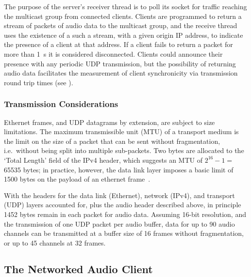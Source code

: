 The purpose of the server's receiver thread is to poll its socket for traffic
reaching the multicast group from connected clients.
Clients are programmed to return a stream of packets of audio data to the
multicast group, and the receive thread uses the existence of a such a stream,
with a given origin IP address, to indicate the presence of a client at that
address.
If a client fails to return a packet for more than \qty{1}{\second} it is
considered disconnected.
Clients could announce their presence with any periodic UDP transmission, but
the possibility of returning audio data facilitates the measurement of client
synchronicity via transmission round trip times (see
).

\subsubsection{Transmission Considerations}\label{subsubsec:transmission-considerations}

Ethernet frames, and UDP datagrams by extension, are subject to size
limitations.
The maximum transmissible unit (MTU) of a transport medium is the limit on the
size of a packet that can be sent without fragmentation, i.e.\ without being
split into multiple sub-packets.
Two bytes are allocated to the `Total Length' field of the IPv4 header, which
suggests an MTU of $2^{16}-1=~$\num{65535} bytes;
in practice, however, the data link layer imposes a basic limit of \num{1500}
bytes on the payload of an ethernet
frame~\citep{schiavoni_alternatives_2013,ieee_ieee_2018}.

With the headers for the data link (Ethernet), network (IPv4), and transport
(UDP) layers accounted for, plus the audio header described above, in principle
\num{1452} bytes remain in each packet for audio data.
Assuming 16-bit resolution, and the transmission of one UDP packet per audio
buffer, data for up to 90 audio channels can be transmitted at a buffer size of
16 frames without fragmentation, or up to 45 channels at 32 frames.

\subsection{The Networked Audio Client}\label{subsec:networked-audio-client}

